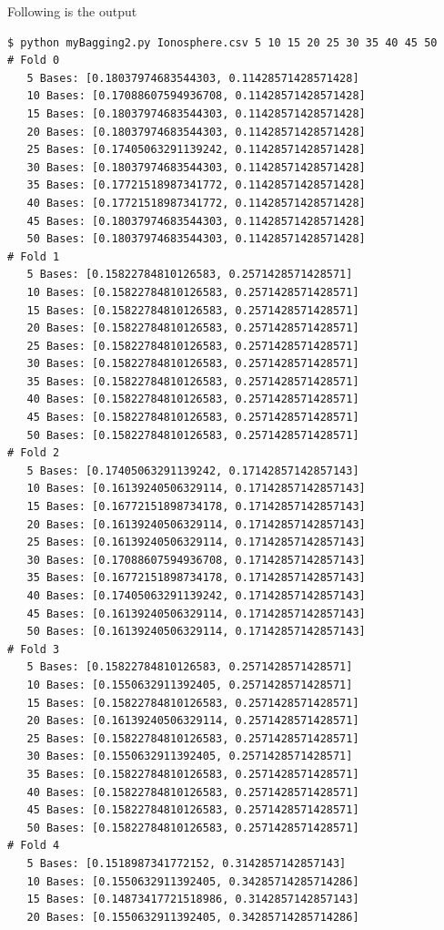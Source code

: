 \documentclass[12pt]{amsart}
\begin{document}
Following is the output
\begin{verbatim}
$ python myBagging2.py Ionosphere.csv 5 10 15 20 25 30 35 40 45 50
# Fold 0
   5 Bases: [0.18037974683544303, 0.11428571428571428]
   10 Bases: [0.17088607594936708, 0.11428571428571428]
   15 Bases: [0.18037974683544303, 0.11428571428571428]
   20 Bases: [0.18037974683544303, 0.11428571428571428]
   25 Bases: [0.17405063291139242, 0.11428571428571428]
   30 Bases: [0.18037974683544303, 0.11428571428571428]
   35 Bases: [0.17721518987341772, 0.11428571428571428]
   40 Bases: [0.17721518987341772, 0.11428571428571428]
   45 Bases: [0.18037974683544303, 0.11428571428571428]
   50 Bases: [0.18037974683544303, 0.11428571428571428]
# Fold 1
   5 Bases: [0.15822784810126583, 0.2571428571428571]
   10 Bases: [0.15822784810126583, 0.2571428571428571]
   15 Bases: [0.15822784810126583, 0.2571428571428571]
   20 Bases: [0.15822784810126583, 0.2571428571428571]
   25 Bases: [0.15822784810126583, 0.2571428571428571]
   30 Bases: [0.15822784810126583, 0.2571428571428571]
   35 Bases: [0.15822784810126583, 0.2571428571428571]
   40 Bases: [0.15822784810126583, 0.2571428571428571]
   45 Bases: [0.15822784810126583, 0.2571428571428571]
   50 Bases: [0.15822784810126583, 0.2571428571428571]
# Fold 2
   5 Bases: [0.17405063291139242, 0.17142857142857143]
   10 Bases: [0.16139240506329114, 0.17142857142857143]
   15 Bases: [0.16772151898734178, 0.17142857142857143]
   20 Bases: [0.16139240506329114, 0.17142857142857143]
   25 Bases: [0.16139240506329114, 0.17142857142857143]
   30 Bases: [0.17088607594936708, 0.17142857142857143]
   35 Bases: [0.16772151898734178, 0.17142857142857143]
   40 Bases: [0.17405063291139242, 0.17142857142857143]
   45 Bases: [0.16139240506329114, 0.17142857142857143]
   50 Bases: [0.16139240506329114, 0.17142857142857143]
# Fold 3
   5 Bases: [0.15822784810126583, 0.2571428571428571]
   10 Bases: [0.1550632911392405, 0.2571428571428571]
   15 Bases: [0.15822784810126583, 0.2571428571428571]
   20 Bases: [0.16139240506329114, 0.2571428571428571]
   25 Bases: [0.15822784810126583, 0.2571428571428571]
   30 Bases: [0.1550632911392405, 0.2571428571428571]
   35 Bases: [0.15822784810126583, 0.2571428571428571]
   40 Bases: [0.15822784810126583, 0.2571428571428571]
   45 Bases: [0.15822784810126583, 0.2571428571428571]
   50 Bases: [0.15822784810126583, 0.2571428571428571]
# Fold 4
   5 Bases: [0.1518987341772152, 0.3142857142857143]
   10 Bases: [0.1550632911392405, 0.34285714285714286]
   15 Bases: [0.14873417721518986, 0.3142857142857143]
   20 Bases: [0.1550632911392405, 0.34285714285714286]

\end{verbatim}
\end{document}
